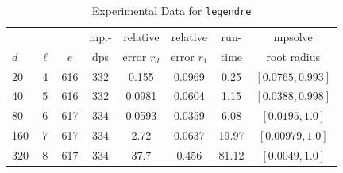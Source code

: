 \documentclass[runningheads]{llncs}
\begin{document}
\begin{table}
\caption{Experimental Data for \texttt{legendre}} %
\label{tab:legendre}
\vskip -0.15in
\begin{center}
\begin{small}
\begin{sc}
\begin{tabular}{lccccccc}
\toprule
&  &  & mp.-& relative  & relative & run- & mpsolve \\
$d$& $\ell$& $e$ & dps&error $r_d$       & error $r_1$ &time& root radius\\
\midrule
 20 & 4 & 616 & 332 & 0.155 & 0.0969 & 0.25 & $[0.0765, 0.993]$\\
 40 & 5 & 616 & 332 & 0.0981 & 0.0604 & 1.15 & $[0.0388, 0.998]$\\
 80 & 6 & 617 & 334 & 0.0593 & 0.0359 & 6.08 & $[0.0195, 1.0]$\\
  160 & 7 & 617 & 334 & 2.72 & 0.0637 & 19.97 & $[0.00979, 1.0]$\\
 320 & 8 & 617 & 334 & 37.7 & 0.456 & 81.12 & $[0.0049, 1.0]$\\
\bottomrule
\end{tabular}
\end{sc}
\end{small}
\end{center}
\vskip 0.05in
\end{table}
\end{document}
